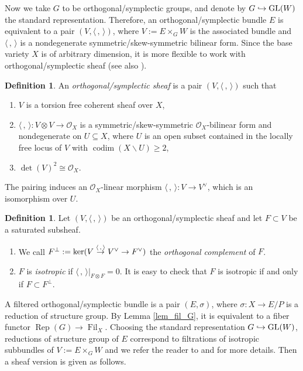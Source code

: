 \documentclass[11pt]{article}
\numberwithin{equation}{section}
\newcommand\hto{\mathrel{\lhook\joinrel\to}}
\newcommand\To[1]{\mathchoice{\xrightarrow{\textstyle\kern4pt#1\kern3pt}}{\stackrel{#1}{\to}}{}{}}
\DeclareMathOperator{\codim}{codim}
\DeclareMathOperator{\Filt}{Fil}
\DeclareMathOperator{\GL}{GL}
\DeclareMathOperator{\Rep}{Rep}
\newcommand{\sO}{{\mathcal O}}
\theoremstyle{plain}
\theoremstyle{definition}
\newtheorem{defn}[thm]{Definition}
\begin{document}
Now we take $G$ to be orthogonal/symplectic groups, and
denote by $G \hto \GL(W)$ the standard representation. Therefore, an orthogonal/symplectic bundle $E$ is equivalent to a pair $(V, \langle \,, \, \rangle)$, where $V:=E \times_G W$ is the associated bundle and $\langle \,, \, \rangle$ is a nondegenerate symmetric/skew-symmetric bilinear form. Since the base variety $X$ is of arbitrary dimension, it is more flexible to work with orthogonal/symplectic sheaf (see also \cite[\S 5]{GS03}).
\begin{defn}
An \emph{orthogonal/symplectic sheaf} is a pair $(V, \langle \,, \, \rangle)$ such that
\begin{enumerate}
\item $V$ is a torsion free coherent sheaf over $X$,

\item $\langle \,, \, \rangle:V\otimes V\to \sO_X$ is a symmetric/skew-symmetric $\sO_X$-bilinear form and nondegenerate on $U \subseteq X$, where $U$ is an open subset contained in the locally free locus of $V$ with $\codim(X \backslash U)\geq 2$,

\item $\det(V)^2 \cong \mathcal{O}_X$.
\end{enumerate}
\end{defn}
The pairing induces an $\sO_X$-linear morphism $\langle \,, \, \rangle: V\to V^{\vee}$, which is an isomorphism over $U$.
\begin{defn}
Let $(V,\langle \,, \, \rangle)$ be an orthogonal/symplectic sheaf and let $F\subset V$ be a saturated subsheaf.
\begin{enumerate}
\item We call $F^{\perp}:=\ker(V\To{\langle \,, \, \rangle} V^{\vee}\to F^{\vee})$ the \emph{orthogonal complement} of $F$.

\item $F$ is \emph{isotropic} if $\langle \,, \, \rangle|_{F\otimes F}=0$. It is easy to check that $F$ is isotropic if and only if $F\subset F^{\perp}$.
\end{enumerate}
\end{defn}

A filtered orthogonal/symplectic bundle is a pair $(E,\sigma)$, where $\sigma: X \to E/P$ is a reduction of structure group. By Lemma \ref{lem_fil_G}, it is equivalent to a fiber functor $\Rep(G) \to \Filt_X$. Choosing the standard representation $G \hto \GL(W)$, reductions of structure group of $E$ correspond to filtrations of isotropic subbundles of $V:=E \times_G W$ and we refer the reader to \cite[\S 6]{CS21} and \cite[\S 5]{Ya22} for more details. Then a sheaf version is given as follows.
\end{document}
